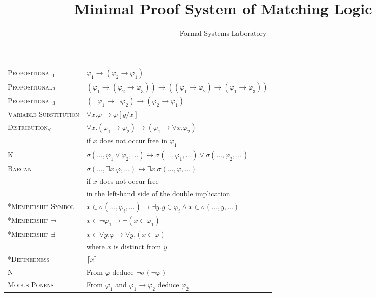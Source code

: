 \documentclass{article}
\title{Minimal Proof System of Matching Logic}
\author{Formal Systems Laboratory}
\newcommand{\imp}{\rightarrow}
\newcommand{\dimp}{\leftrightarrow}
\DeclarePairedDelimiter\ceil{\lceil}{\rceil}
\begin{document}
	\maketitle

\bgroup
\def\arraystretch{1.25}
\begin{longtable}{ll}
	 \textsc{Propositional$_1$}
  &  $\varphi_1 \imp (\varphi_2 \imp \varphi_1)$
  \\
     \textsc{Propositional$_2$}
  &  $(\varphi_1 \imp (\varphi_2 \imp \varphi_3)) 
      \imp ((\varphi_1 \imp \varphi_2) \imp (\varphi_1 \imp \varphi_3))$
  \\
     \textsc{Propositional$_3$}
  &  $(\neg \varphi_1 \imp \neg \varphi_2) \imp (\varphi_2 \imp \varphi_1)$
  \\
     \textsc{Variable Substitution}
  &  $\forall x . \varphi \imp \varphi[y/x]$
  \\
     \textsc{Distribution$_\forall$}
  &  $\forall x . (\varphi_1 \imp \varphi_2) 
     \imp (\varphi_1 \imp \forall x . \varphi_2)$
  \\
  &
     if $x$ does not occur free in $\varphi_1$
  \\
     \textsc{K}
  &  $\sigma(\dots,\varphi_1 \vee \varphi_2,\dots) 
      \dimp
      \sigma(\dots,\varphi_1,\dots) \vee \sigma(\dots,\varphi_2,\dots)$
  \\
     \textsc{Barcan}
  &  $\sigma(\dots,\exists x . \varphi,\dots) \dimp \exists x . 
      \sigma(\dots, \varphi,\dots)$
  \\
  &
     if $x$ does not occur free
  \\
  &  in the left-hand side of the double implication
  \\
    \textsc{*Membership Symbol}
  &  $x \in \sigma(\dots,\varphi_i,\dots) \imp \exists y . y \in 
  \varphi_i \wedge x 
  \in \sigma(\dots,y,\dots)$
  \\
    \textsc{*Membership $\neg$}
  &  $x \in \neg \varphi_1 \imp \neg (x \in \varphi_1)$
  \\
    \textsc{*Membership $\exists$}
  &  $x \in \forall y . \varphi
      \imp \forall y . (x \in \varphi)$
  \\
  &
     where $x$ is distinct from $y$
  \\
    \textsc{*Definedness}
  &  $\ceil{x}$
  \\
     \textsc{N}
  &  From $\varphi$ deduce $\neg \sigma(\neg \varphi)$
  \\
     \textsc{Modus Ponens}
  &  From $\varphi_1$ and $\varphi_1 \imp \varphi_2$ deduce $\varphi_2$
  \\

\end{longtable}
\end{document}
